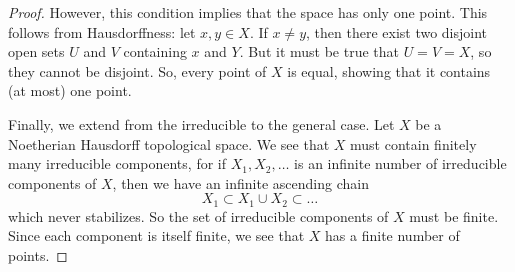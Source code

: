 \documentclass[12pt]{article}
\theoremstyle{definition}
\newenvironment{problem}[2][Problem]{\begin{trivlist}
\item[\hskip \labelsep {\bfseries #1}\hskip \labelsep {\bfseries #2.}]}{\end{trivlist}}
\begin{document}
\begin{problem}{1}
\begin{enumerate}[label=(\alph*)]
\begin{proof}
	    \par However, this condition implies that the space has only one point. This follows from Hausdorffness: let $x, y \in X$. If $x \neq y$, then there exist two disjoint open sets $U$ and $V$ containing $x$ and $Y$. But it must be true that $U = V = X$, so they cannot be disjoint. So, every point of $X$ is equal, showing that it contains (at most) one point.
	    \par Finally, we extend from the irreducible to the general case. Let $X$ be a Noetherian Hausdorff topological space. We see that $X$ must contain finitely many irreducible components, for if $X_1, X_2, \dots$ is an infinite number of irreducible components of $X$, then we have an infinite ascending chain
	    \[X_1 \subset X_1 \cup X_2 \subset \dots\]
	    which never stabilizes. So the set of irreducible components of $X$ must be finite. Since each component is itself finite, we see that $X$ has a finite number of points.
    \end{proof}
\end{enumerate}
\end{problem}
\end{document}
